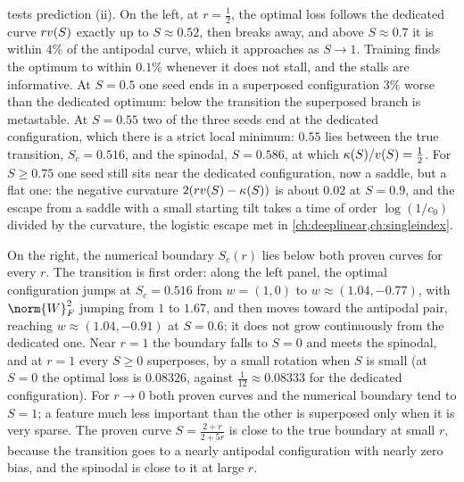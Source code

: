 \begin{refsection}
 tests prediction (ii). On the left, at $r=\frac12$, the optimal loss follows the dedicated curve $rv(S)$ exactly up to $S\approx0.52$, then breaks away, and above $S\approx0.7$ it is within $4\%$ of the antipodal curve, which it approaches as $S\to1$. Training finds the optimum to within $0.1\%$ whenever it does not stall, and the stalls are informative. At $S=0.5$ one seed ends in a superposed configuration $3\%$ worse than the dedicated optimum: below the transition the superposed branch is metastable. At $S=0.55$ two of the three seeds end at the dedicated configuration, which there is a strict local minimum: $0.55$ lies between the true transition, $S_c=0.516$, and the spinodal, $S=0.586$, at which $\kappa(S)/v(S)=\frac12$. For $S\ge0.75$ one seed still sits near the dedicated configuration, now a saddle, but a flat one: the negative curvature $2(rv(S)-\kappa(S))$ is about $0.02$ at $S=0.9$, and the escape from a saddle with a small starting tilt takes a time of order $\log(1/c_0)$ divided by the curvature, the logistic escape met in \cref{ch:deeplinear,ch:singleindex}.

On the right, the numerical boundary $S_c(r)$ lies below both proven curves for every $r$. The transition is first order: along the left panel, the optimal configuration jumps at $S_c=0.516$ from $w=(1,0)$ to $w\approx(1.04,-0.77)$, with $\norm{W}_F^2$ jumping from $1$ to $1.67$, and then moves toward the antipodal pair, reaching $w\approx(1.04,-0.91)$ at $S=0.6$; it does not grow continuously from the dedicated one. Near $r=1$ the boundary falls to $S=0$ and meets the spinodal, and at $r=1$ every $S\ge0$ superposes, by a small rotation when $S$ is small (at $S=0$ the optimal loss is $0.08326$, against $\frac1{12}\approx0.08333$ for the dedicated configuration). For $r\to0$ both proven curves and the numerical boundary tend to $S=1$; a feature much less important than the other is superposed only when it is very sparse. The proven curve $S=\frac{2+r}{2+5r}$ is close to the true boundary at small $r$, because the transition goes to a nearly antipodal configuration with nearly zero bias, and the spinodal is close to it at large $r$.


\end{refsection}
